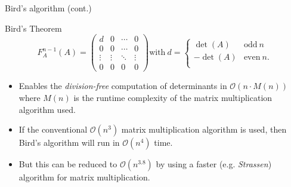 \documentclass{beamer}
\begin{document}
\begin{frame}{Bird's algorithm (cont.)}

    \begin{block}{Bird's Theorem}
        \[
            F_A^{n-1}(A) =
            \begin{pmatrix}{}
                d      & 0      & \cdots & 0 \\
                0      & 0      & \cdots & 0 \\
                \vdots & \vdots & \ddots & \vdots \\
                0      & 0      & 0      & 0
            \end{pmatrix}
            \text{with} \ d =
            \begin{cases}{}
                \det(A)  & \text{odd} \ n \\
                -\det(A) & \text{even} \ n. \\
            \end{cases}
        \]
    \end{block}

    \pause{}

    \begin{itemize}

        \item Enables the \emph{division-free} computation of determinants in
            $\mathcal{O}(n\cdot M(n))$ where $M(n)$ is the runtime complexity of the matrix
            multiplication algorithm used.

        \item If the conventional $\mathcal{O}(n^3)$ matrix multiplication algorithm is used,
            then Bird's algorithm will run in $\mathcal{O}(n^4)$ time.

        \item But this can be reduced to $\mathcal{O}(n^{3.8})$ by using a faster
            (e.g. \emph{Strassen}) algorithm for matrix multiplication.

    \end{itemize}

\end{frame}
\end{document}
